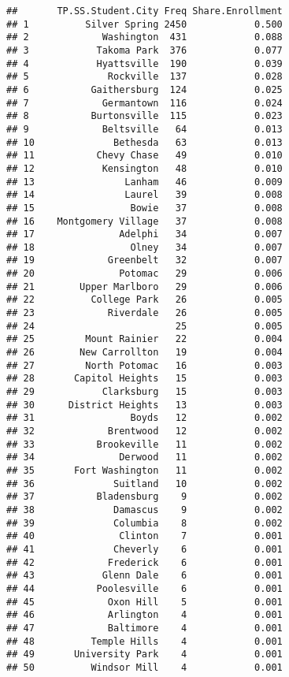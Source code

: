 \documentclass[]{article}
\begin{document}
\begin{verbatim}
##       TP.SS.Student.City Freq Share.Enrollment
## 1          Silver Spring 2450            0.500
## 2             Washington  431            0.088
## 3            Takoma Park  376            0.077
## 4            Hyattsville  190            0.039
## 5              Rockville  137            0.028
## 6           Gaithersburg  124            0.025
## 7             Germantown  116            0.024
## 8           Burtonsville  115            0.023
## 9             Beltsville   64            0.013
## 10              Bethesda   63            0.013
## 11           Chevy Chase   49            0.010
## 12            Kensington   48            0.010
## 13                Lanham   46            0.009
## 14                Laurel   39            0.008
## 15                 Bowie   37            0.008
## 16    Montgomery Village   37            0.008
## 17               Adelphi   34            0.007
## 18                 Olney   34            0.007
## 19             Greenbelt   32            0.007
## 20               Potomac   29            0.006
## 21        Upper Marlboro   29            0.006
## 22          College Park   26            0.005
## 23             Riverdale   26            0.005
## 24                         25            0.005
## 25         Mount Rainier   22            0.004
## 26        New Carrollton   19            0.004
## 27         North Potomac   16            0.003
## 28       Capitol Heights   15            0.003
## 29            Clarksburg   15            0.003
## 30      District Heights   13            0.003
## 31                 Boyds   12            0.002
## 32             Brentwood   12            0.002
## 33           Brookeville   11            0.002
## 34               Derwood   11            0.002
## 35       Fort Washington   11            0.002
## 36              Suitland   10            0.002
## 37           Bladensburg    9            0.002
## 38              Damascus    9            0.002
## 39              Columbia    8            0.002
## 40               Clinton    7            0.001
## 41              Cheverly    6            0.001
## 42             Frederick    6            0.001
## 43            Glenn Dale    6            0.001
## 44           Poolesville    6            0.001
## 45             Oxon Hill    5            0.001
## 46             Arlington    4            0.001
## 47             Baltimore    4            0.001
## 48          Temple Hills    4            0.001
## 49       University Park    4            0.001
## 50          Windsor Mill    4            0.001

\end{verbatim}
\end{document}
